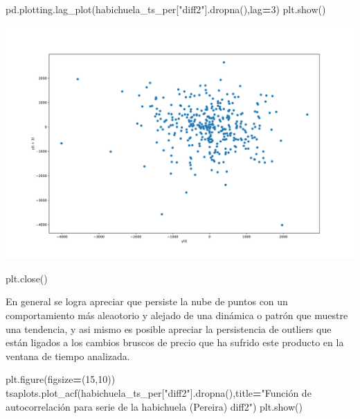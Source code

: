 \documentclass[
]{book}
\newenvironment{Shaded}{\begin{snugshade}}{\end{snugshade}}
\newcommand{\DecValTok}[1]{\textcolor[rgb]{0.00,0.00,0.81}{#1}}
\newcommand{\NormalTok}[1]{#1}
\newcommand{\OperatorTok}[1]{\textcolor[rgb]{0.81,0.36,0.00}{\textbf{#1}}}
\newcommand{\StringTok}[1]{\textcolor[rgb]{0.31,0.60,0.02}{#1}}
\begin{document}
\begin{Shaded}
\begin{Highlighting}[]


\NormalTok{pd.plotting.lag\_plot(habichuela\_ts\_per[}\StringTok{"diff2"}\NormalTok{].dropna(),lag}\OperatorTok{=}\DecValTok{3}\NormalTok{)}
\NormalTok{plt.show()}
\end{Highlighting}
\end{Shaded}

\includegraphics{bookdown-demo_files/figure-latex/unnamed-chunk-115-101.pdf}

\begin{Shaded}
\begin{Highlighting}[]
\NormalTok{plt.close()}
\end{Highlighting}
\end{Shaded}

En general se logra apreciar que persiste la nube de puntos con un comportamiento más aleaotorio y alejado de una dinámica o patrón que muestre una tendencia, y asi mismo es posible apreciar la persistencia de outliers que están ligados a los cambios bruscos de precio que ha sufrido este producto en la ventana de tiempo analizada.

\begin{Shaded}
\begin{Highlighting}[]
\NormalTok{plt.figure(figsize}\OperatorTok{=}\NormalTok{(}\DecValTok{15}\NormalTok{,}\DecValTok{10}\NormalTok{))}
\NormalTok{tsaplots.plot\_acf(habichuela\_ts\_per[}\StringTok{"diff2"}\NormalTok{].dropna(),title}\OperatorTok{=}\StringTok{"Función de autocorrelación para serie de la habichuela (Pereira) diff2"}\NormalTok{)}
\NormalTok{plt.show()}
\end{Highlighting}
\end{Shaded}
\end{document}
